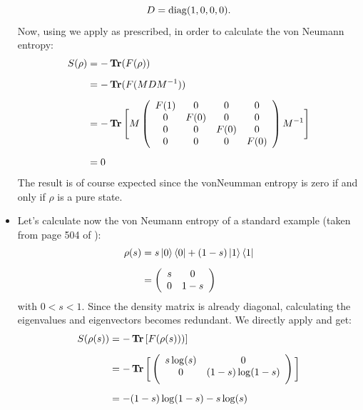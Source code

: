 \begin{itemize}
\begin{equation}
D= \operatorname{diag} (1,0,0,0).
\label{diag}
\end{equation}
Now, using  we apply  as prescribed, in order to calculate the von Neumann entropy:
\begin{align}
S(\rho) &= -\operatorname{\textup{\textbf{Tr}}} (F(\rho))\label{functionimp:1} \\[0.5em] 
&= -\operatorname{\textup{\textbf{Tr}}} (F(MDM^{-1})) \nonumber \\[0.5em]
&=-\operatorname{\textup{\textbf{Tr}}} \Bigg[
M
\left( \begin{array}{cccc}
 F(1) & 0 & 0 & 0 \\
 0 & F(0) & 0 & 0 \\
 0 & 0 & F(0) & 0 \\
 0 & 0 & 0 & F(0) \\
\end{array}
\right)
M^{-1}
\Bigg]
\nonumber\\[0.5em]
&=0
\label{functionimp}
\end{align}  
The result is of course expected since the vonNeumman entropy is zero if and only if $\rho$ is a pure state.

\item
Let's calculate now the von Neumann entropy of a standard example (taken from page 504 of \citep{nielsen_chuang_2010}):
\begin{align}
\rho(s) & = s \ket{0} \bra{0} + (1-s) \ket{1} \bra{1} \\[0.5em] & =  \left(
\begin{array}{cc}
 s & 0 \\
 0 & 1-s \\
\end{array}
\right)
\label{ffrefer}
\end{align}
with $0<s<1$.
Since the density matrix is already diagonal, calculating the eigenvalues and eigenvectors becomes redundant. We directly apply  and get:
\begin{align}
S(\rho(s)) &= - \operatorname{\textup{\textbf{Tr}}} \left[ F(\rho(s))) \right] \\[0.5em] &=
-\operatorname{\textup{\textbf{Tr}}} \bigg[ \left(
\begin{array}{cc}
 s \log (s) & 0 \\
 0 & (1-s) \log (1-s) \\[0.5em]
\end{array}
\right) \bigg] \\[0.5em]
&= -(1-s) \log (1-s)-s \log (s)
\end{align}


\end{itemize}

